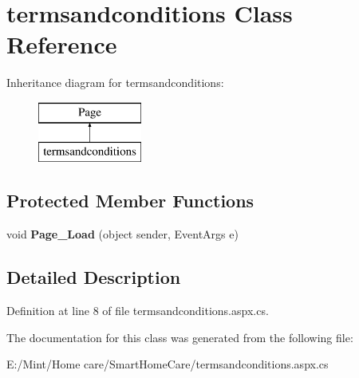 \hypertarget{classtermsandconditions}{\section{termsandconditions Class Reference}
\label{classtermsandconditions}
}
Inheritance diagram for termsandconditions\-:\begin{figure}[H]
\begin{center}
\leavevmode
\includegraphics[height=2.000000cm]{classtermsandconditions}
\end{center}
\end{figure}
\subsection*{Protected Member Functions}
\begin{DoxyCompactItemize}
\item 
\hypertarget{classtermsandconditions_a72071d075dca165af6884d9314f29a79}{void {\bfseries Page\-\_\-\-Load} (object sender, Event\-Args e)}\label{classtermsandconditions_a72071d075dca165af6884d9314f29a79}

\end{DoxyCompactItemize}


\subsection{Detailed Description}


Definition at line 8 of file termsandconditions.\-aspx.\-cs.



The documentation for this class was generated from the following file\-:\begin{DoxyCompactItemize}
\item 
E\-:/\-Mint/\-Home care/\-Smart\-Home\-Care/termsandconditions.\-aspx.\-cs\end{DoxyCompactItemize}
